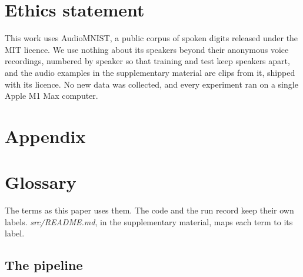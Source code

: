 \documentclass{article}
\makeatletter
\newcommand{\iclr@floatbarrier}{\par\vspace{\z@}%
  \ifx\@deferlist\@empty\else\clearpage\fi}
\let\iclr@section\section
\renewcommand{\section}{\iclr@floatbarrier\iclr@section}
\makeatother
\begin{document}
\section*{Ethics statement}\label{ethics-statement}

This work uses AudioMNIST, a public corpus of spoken digits released
under the MIT licence. We use nothing about its speakers beyond their
anonymous voice recordings, numbered by speaker so that training and
test keep speakers apart, and the audio examples in the supplementary
material are clips from it, shipped with its licence. No new data was
collected, and every experiment ran on a single Apple M1 Max computer.


\appendix
\section*{Appendix}\label{appendix}

\section{Glossary}\label{sec-A}

The terms as this paper uses them. The code and the run record keep
their own labels. \emph{src/README.md}, in the supplementary material,
maps each term to its label.

\subsection{The pipeline}\label{sec-A-1}
\end{document}
